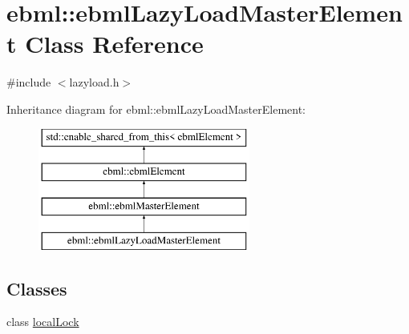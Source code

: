 \hypertarget{classebml_1_1ebmlLazyLoadMasterElement}{}\section{ebml\+:\+:ebml\+Lazy\+Load\+Master\+Element Class Reference}
\label{classebml_1_1ebmlLazyLoadMasterElement}


{\ttfamily \#include $<$lazyload.\+h$>$}

Inheritance diagram for ebml\+:\+:ebml\+Lazy\+Load\+Master\+Element\+:\begin{figure}[H]
\begin{center}
\leavevmode
\includegraphics[height=4.000000cm]{classebml_1_1ebmlLazyLoadMasterElement}
\end{center}
\end{figure}
\subsection*{Classes}
\begin{DoxyCompactItemize}
\item 
class \mbox{\hyperlink{classebml_1_1ebmlLazyLoadMasterElement_1_1localLock}{local\+Lock}}
\end{DoxyCompactItemize}
